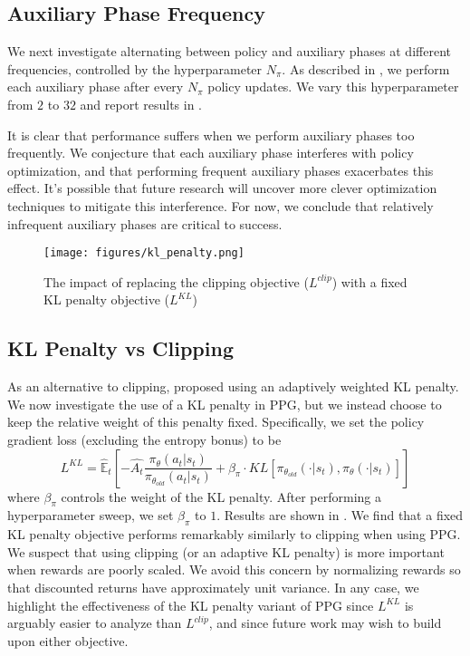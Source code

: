 \documentclass{article}
\begin{document}
\subsection{Auxiliary Phase Frequency}

We next investigate alternating between policy and auxiliary phases at different frequencies, controlled by the hyperparameter $N_{\pi}$. As described in , we perform each auxiliary phase after every $N_{\pi}$ policy updates. We vary this hyperparameter from $2$ to $32$ and report results in .

It is clear that performance suffers when we perform auxiliary phases too frequently. We conjecture that each auxiliary phase interferes with policy optimization, and that performing frequent auxiliary phases exacerbates this effect. It's possible that future research will uncover more clever optimization techniques to mitigate this interference. For now, we conclude that relatively infrequent auxiliary phases are critical to success.

\begin{figure*}
\centering
\texttt{[image: figures/kl\_penalty.png]}
\caption{The impact of replacing the clipping objective ($L^{clip}$) with a fixed KL penalty objective ($L^{KL}$)}
\label{fig:kl_penalty}
\end{figure*}

\subsection{KL Penalty vs Clipping}

As an alternative to clipping, \cite{ppo} proposed using an adaptively weighted KL penalty. We now investigate the use of a KL penalty in PPG, but we instead choose to keep the relative weight of this penalty fixed. Specifically, we set the policy gradient loss (excluding the entropy bonus) to be $$L^{KL} = \mathbb{\hat{E}}_t\left[-\hat{A_t}\frac{\pi_{\theta}(a_t|s_t)}{\pi_{\theta_{old}}(a_t|s_t)} + \beta_{\pi} \cdot  KL[\pi_{\theta_{old}}(\cdot|s_t),\pi_{\theta}(\cdot|s_t)]\right]$$ where $\beta_{\pi}$ controls the weight of the KL penalty. After performing a hyperparameter sweep, we set $\beta_{\pi}$ to $1$. Results are shown in . We find that a fixed KL penalty objective performs remarkably similarly to clipping when using PPG. We suspect that using clipping (or an adaptive KL penalty) is more important when rewards are poorly scaled. We avoid this concern by normalizing rewards so that discounted returns have approximately unit variance. In any case, we highlight the effectiveness of the KL penalty variant of PPG since $L^{KL}$ is arguably easier to analyze than $L^{clip}$, and since future work may wish to build upon either objective.
\end{document}
